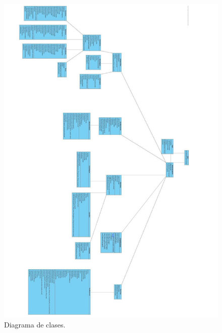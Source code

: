 \begin{figure}[H]
	\centering
	\includegraphics[width=1.1\textwidth, angle=180]{imagenes/imagenesDiagramas/diagramaClases.jpg}
	\caption{Diagrama de clases.}
	\label{fig:diagramaClases}
\end{figure}
